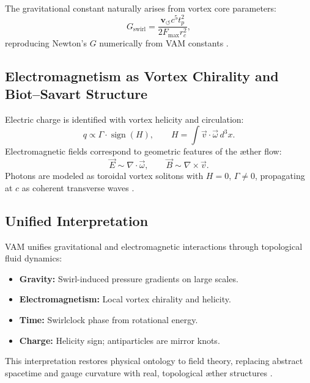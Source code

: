 \documentclass[preprint]{revtex4-2}
\begin{document}
The gravitational constant naturally arises from vortex core parameters:
\begin{equation}
G_\text{swirl} = \frac{\mathbf{v}_{\scriptscriptstyle\boldsymbol{\circlearrowleft}} c^5 t_p^2}{2 F_{\text{max}} r_c^2},
\end{equation}
reproducing Newton's \( G \) numerically from VAM constants \cite{iskandarani2025vam2}.

\subsection{Electromagnetism as Vortex Chirality and Biot–Savart Structure}

Electric charge is identified with vortex helicity and circulation:
\begin{equation}
q \propto \Gamma \cdot \operatorname{sign}(H), \qquad H = \int \vec{v} \cdot \vec{\omega} \, d^3x.
\end{equation}
Electromagnetic fields correspond to geometric features of the æther flow:
\begin{equation}
\vec{E} \sim \nabla \cdot \vec{\omega}, \qquad \vec{B} \sim \nabla \times \vec{v}.
\end{equation}
Photons are modeled as toroidal vortex solitons with \( H = 0 \), \( \Gamma \neq 0 \), propagating at \( c \) as coherent transverse waves \cite{Battye1998, Ranada1989}.

\subsection{Unified Interpretation}

VAM unifies gravitational and electromagnetic interactions through topological fluid dynamics:
\begin{itemize}
  \item \textbf{Gravity:} Swirl-induced pressure gradients on large scales.
  \item \textbf{Electromagnetism:} Local vortex chirality and helicity.
  \item \textbf{Time:} Swirlclock phase from rotational energy.
  \item \textbf{Charge:} Helicity sign; antiparticles are mirror knots.
\end{itemize}

This interpretation restores physical ontology to field theory, replacing abstract spacetime and gauge curvature with real, topological æther structures \cite{iskandarani2025vam2}.
\end{document}
